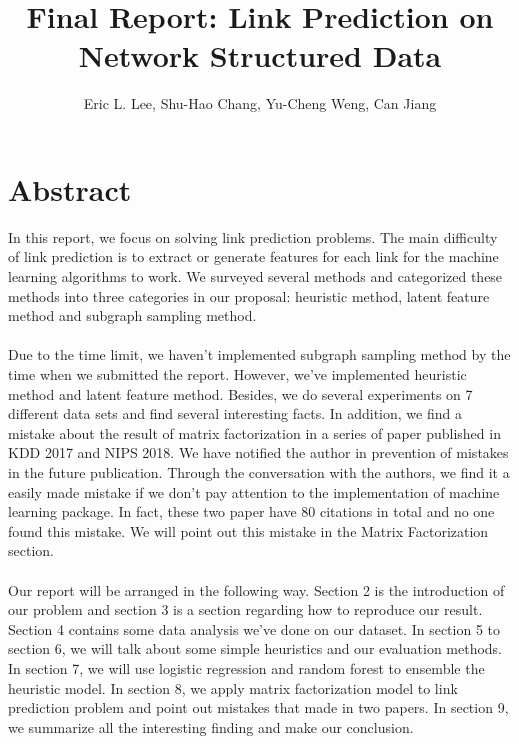 \documentclass[12pt]{article}
\begin{document}
 
\title{Final Report: Link Prediction on Network Structured Data}
\author{Eric L. Lee, Shu-Hao Chang, Yu-Cheng Weng, Can Jiang} 
\maketitle

\section{Abstract}
In this report, we focus on solving link prediction problems. The main difficulty of link prediction is to extract or generate features for each link for the machine learning algorithms to work. We surveyed several methods and categorized these methods into three categories in our proposal: heuristic method, latent feature method and subgraph sampling method.
\\ \\
Due to the time limit, we haven't implemented subgraph sampling method by the time when we submitted the report. However, we've implemented heuristic method and latent feature method. Besides, we do several experiments on 7 different data sets and find several interesting facts. In addition, we find a mistake about the result of matrix factorization in a series of paper published in KDD 2017 and NIPS 2018. We have notified the author in prevention of mistakes in the future publication. Through the conversation with the authors, we find it a easily made mistake if we don't pay attention to the implementation of machine learning package. In fact, these two paper have 80 citations in total and no one found this mistake. We will point out this mistake in the Matrix Factorization section.
\\ \\
Our report will be arranged in the following way. Section 2 is the introduction of our problem and section 3 is a section regarding how to reproduce our result. Section 4 contains some data analysis we've done on our dataset. In section 5 to section 6, we will talk about some simple heuristics and our evaluation methods. In section 7, we will use logistic regression and random forest to ensemble the heuristic model. In section 8, we apply matrix factorization model to link prediction problem and point out mistakes that made in two papers. In section 9, we summarize all the interesting finding and make our conclusion.
\end{document}
